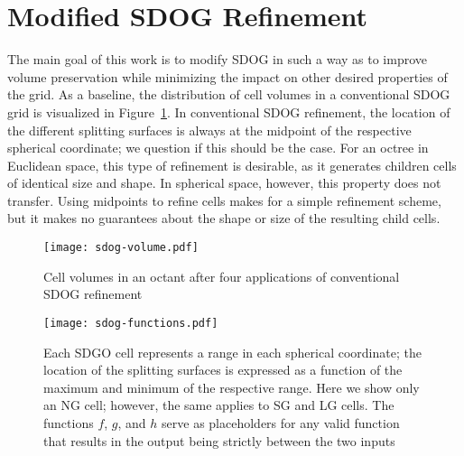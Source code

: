 \section{Modified SDOG Refinement} \label{chap:4:modified}
The main goal of this work is to modify SDOG in such a way as to improve volume preservation while minimizing the impact on other desired properties of the grid.
As a baseline, the distribution of cell volumes in a conventional SDOG grid is visualized in Figure~\ref{fig:sdog-volume}.
In conventional SDOG refinement, the location of the different splitting surfaces is always at the midpoint of the respective spherical coordinate; we question if this should be the case.
For an octree in Euclidean space, this type of refinement is desirable, as it generates children cells of identical size and shape.
In spherical space, however, this property does not transfer.
Using midpoints to refine cells makes for a simple refinement scheme, but it makes no guarantees about the shape or size of the resulting child cells.


\begin{figure}[ht!]
	\centering
	\texttt{[image: sdog-volume.pdf]}
	\caption[Visualization of cell volumes in SDOG]{
		Cell volumes in an octant after four applications of conventional SDOG refinement
	}
	\label{fig:sdog-volume}
\end{figure}


\begin{figure}[ht!]
	\centering
	\texttt{[image: sdog-functions.pdf]}
	\caption[How functions determine the location of SDOG splitting surfaces]{
		Each SDGO cell represents a range in each spherical coordinate; the location of the splitting surfaces is expressed as a function of the maximum and minimum of the respective range.
		Here we show only an NG cell; however, the same applies to SG and LG cells.
		The functions $f$, $g$, and $h$ serve as placeholders for any valid function that results in the output being strictly between the two inputs
	}
	\label{fig:functions}
\end{figure}


